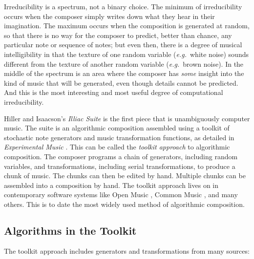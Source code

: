 \documentclass[]{interact}
\theoremstyle{plain}%
\theoremstyle{definition}
\theoremstyle{remark}
\begin{document}
Irreducibility is a spectrum, not a binary choice. The minimum of irreducibility occurs when the composer simply writes down what they hear in their imagination. The maximum occurs when the composition is generated at random, so that there is no way for the composer to predict, better than chance, any particular note or sequence of notes; but even then, there is a degree of musical intelligibility in that the texture of one random variable (\emph{e.g.}\ white noise) sounds different from the texture of another random variable (\emph{e.g.}\ brown noise). In the middle of the spectrum is an area where the composer has \emph{some} insight into the kind of music that will be generated, even though details cannot be predicted. And this is the most interesting and most useful degree of computational irreducibility. 

Hiller and Isaacson's \emph{Illiac Suite} \citep{illiacsuite} is the first piece that is unambiguously computer music. The suite is an algorithmic composition assembled using a toolkit of stochastic note generators and music transformation functions, as detailed in \emph{Experimental Music} \citep{hiller}. This can be called the \emph{toolkit approach} to algorithmic composition. The composer programs a chain of generators, including random variables, and transformations, including serial transformations, to produce a chunk of music. The chunks can then be edited by hand. Multiple chunks can be assembled into a composition by hand. The toolkit approach lives on in contemporary software systems like Open Music \citep{OpenMusic}, Common Music \citep{CommonMusic, musx}, and many others. This is to date the most widely used method of algorithmic composition. 

\subsection{Algorithms in the Toolkit}

The toolkit approach includes generators and transformations from many sources:
\end{document}
